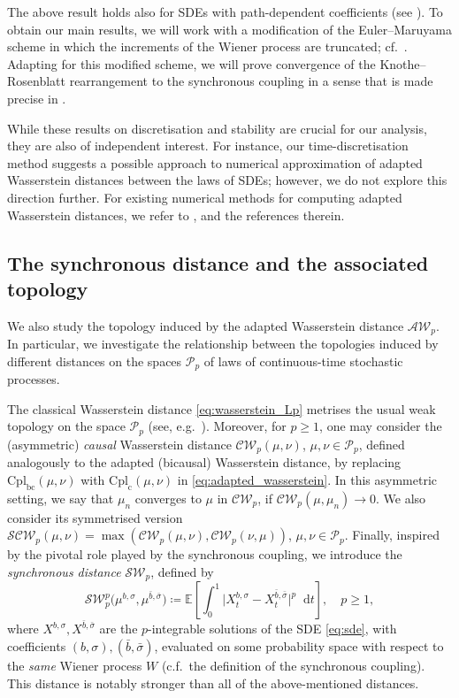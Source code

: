 \documentclass[oneside]{amsart}
\theoremstyle{definition}
\newcommand{\AW}{\mathcal A\mathcal W}
\newcommand{\Pc}{\mathcal P}
\newcommand{\cplc}{\mathrm{Cpl}_{\mathrm{c}}}
\newcommand{\cplbc}{\mathrm{Cpl}_{\mathrm{bc}}}
\newcommand{\CW}{\mathcal C\mathcal W}
\newcommand{\SCW}{\mathcal S\mathcal C\mathcal W}
\newcommand{\SW}{\mathcal{SW}}
\newcommand{\D}{\mathop{}\!\mathrm{d}}
\def\E{{\mathbb E}}
\numberwithin{equation}{section}
\begin{document}
The above result holds also for SDEs with path-dependent coefficients (see ). To obtain our main results, we will work with a modification of the Euler--Maruyama scheme in which the increments of the Wiener process are truncated; cf.~\citet{MiReTr02,LiPa22}. Adapting  for this modified scheme, we will prove convergence of the Knothe--Rosenblatt rearrangement to the synchronous coupling in a sense that is made precise in .

While these results on discretisation and stability are crucial for our analysis, they are also of independent interest. For instance, our time-discretisation method suggests a possible approach to numerical approximation of adapted Wasserstein distances between the laws of SDEs; however, we do not explore this direction further. 
For existing numerical methods for computing adapted Wasserstein distances, we refer to \citet{EcPa22,PiWe21}, and the references therein.


\subsection*{The synchronous distance and the associated topology}

	We also study the topology induced by the adapted Wasserstein distance $\AW_p$.
	In particular, we investigate the relationship between the topologies induced by different distances on the spaces $\Pc_p$ of laws of continuous-time stochastic processes.
	
	The classical Wasserstein distance  \eqref{eq:wasserstein_Lp} metrises the usual weak topology on the space $\Pc_p$ (see, e.g.~\citep[Theorem 7.12]{Vi03}).
	Moreover, for $p \geq 1$, one may consider the (asymmetric) \emph{causal} Wasserstein distance $\CW_p(\mu,\nu)$, $\mu, \nu \in \Pc_p$, defined analogously to the adapted (bicausal) Wasserstein distance, by replacing $\cplbc(\mu,\nu)$ with $\cplc(\mu,\nu)$ in \eqref{eq:adapted_wasserstein}. In this asymmetric setting, we say that $\mu_n$ converges to $\mu$ in $\CW_p$, if $\CW_p(\mu,\mu_n)\to 0$. We also consider its symmetrised version $\SCW_p(\mu,\nu)=\max(\CW_p(\mu,\nu),\CW_p(\nu,\mu))$, $\mu,\nu\in\Pc_p$.
	Finally, inspired by the pivotal role played by the synchronous coupling, we introduce the \emph{synchronous distance} $\SW_p$, defined by
	\begin{equation}
		\SW_p^p\big(\mu^{b,\sigma},\mu^{\bar b,\bar\sigma}\big)
		 \coloneqq \E\!\left[\int_0^1\big|X^{b,\sigma}_t-X^{\bar b,\bar\sigma}_t\big|^p \D t \right], \quad p \geq 1,
	\end{equation}
	where $X^{b,\sigma},X^{\bar b,\bar\sigma}$ are the $p$-integrable solutions of the SDE \eqref{eq:sde}, with coefficients $(b, \sigma),(\bar b, \bar \sigma)$, evaluated on some probability space with respect to the \emph{same} Wiener process $W$ (c.f.~the definition of the synchronous coupling). 
	This distance is notably stronger than all of the above-mentioned distances.
		
\end{document}
